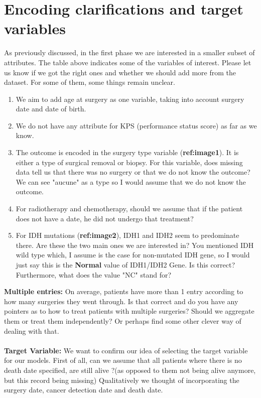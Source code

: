 \documentclass[a4paper]{article}
\begin{document}
\section{Encoding clarifications and target variables}
As previously discussed, in the first phase we are interested in a smaller subset of attributes. The table above indicates some of the variables of interest. Please let us know if we got the right ones and whether we should add more from the dataset. For some of them, some things remain unclear.\\
\begin{enumerate}
\item We aim to add age at surgery as one variable, taking into account surgery date and date of birth. 
\item We do not have any attribute for KPS (performance status score) as far as we know. 
\item The outcome is encoded in the surgery type variable (\textbf{ref:image1}). It is either a type of surgical removal or biopsy. For this variable, does missing data tell us that there was no surgery or that we do not know the outcome?
We can see "aucune" as a type so I would assume that we do not know the outcome. 
\item For radiotherapy and chemotherapy, should we assume that if the patient does not have a date, he did not undergo that treatment? 
\item For IDH mutations (\textbf{ref:image2}), IDH1 and IDH2 seem to predominate there. Are these the two main ones we are interested in? You mentioned IDH wild type which, I assume is the case for non-mutated IDH gene, so I would just say this is the \textbf{Normal} value of IDH1/IDH2 Gene. Is this correct? Furthermore, what does the value "NC" stand for?
\end{enumerate}
%
\textbf{Multiple entries:} On average, patients have more than 1 entry according to how many surgeries they went through. Is that correct and do you have any pointers as to how to treat patients with multiple surgeries? Should we aggregate them or treat them independently? Or perhaps find some other clever way of dealing with that. \\
\\ 
\textbf{Target Variable:}
We want to confirm our idea of selecting the target variable for our models. 
First of all, can we assume that all patients where there is no death date specified, are still alive ?(as opposed to them not being alive anymore, but this record being missing)
Qualitatively we thought of incorporating the surgery date, cancer detection date and death date. 
\end{document}

